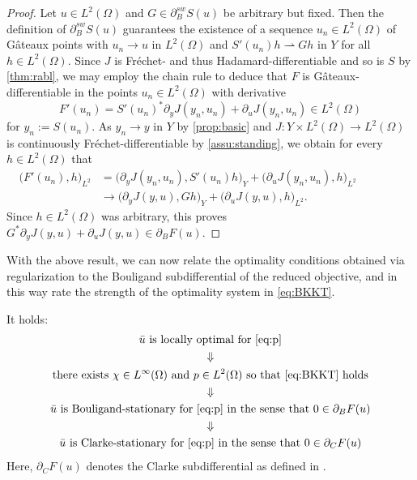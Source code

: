 \documentclass[reqno]{shinyart}
\begin{document}
\begin{proof}
    Let $u \in L^2(\Omega)$ and $G \in  \partial_B^{sw} S(u)$ be arbitrary but fixed. 
    Then the definition of $\partial_B^{sw} S(u)$ guarantees the existence of a sequence 
    $u_n \in L^2(\Omega)$ of G\^ateaux points with $u_n \to u$ in $L^2(\Omega)$ 
    and $S'(u_n)h \rightharpoonup G h$ in $Y$ for all $h \in L^2(\Omega)$. 
    Since $J$ is Fr\'echet- and thus Hadamard-differentiable and so is $S$ by 
    \cref{thm:rabl}, we may employ the chain rule 
    to deduce that $F$ is G\^ateaux-differentiable in the points $u_n \in L^2(\Omega)$ with
    derivative
    \begin{equation*}
        F'(u_n) = S'(u_n)^*\partial_y J(y_n, u_n) + \partial_u J( y_n, u_n) \in L^2(\Omega)
    \end{equation*}
    for $y_n := S(u_n)$. As $y_n \to y$ in $Y$ by \cref{prop:basic} 
    and $J : Y \times L^2(\Omega) \to L^2(\Omega)$ is continuously Fr\'echet-differentiable
    by \cref{assu:standing}, we obtain for every $h\in L^2(\Omega)$ that 
    \begin{equation*}
        \begin{aligned}
            \big( F'(u_n), h \big)_{L^2} 
            &=  \big( \partial_y J(y_n, u_n) , S'(u_n)h \big)_{Y} 
            + \big(\partial_u J( y_n, u_n) , h\big)_{L^2}\qquad\qquad \\
            &\to \big( \partial_y J(y, u) , G h\big )_{Y} +  \big(\partial_u J( y, u) , h \big)_{L^2}. 
        \end{aligned}
    \end{equation*}
    Since $h\in L^2(\Omega)$ was arbitrary, 
    this proves $G^*\partial_y J(y, u) + \partial_u J( y, u) \in \partial_B F(u)$.
\end{proof}

With the above result, we can now relate the optimality conditions obtained via regularization 
to the Bouligand subdifferential of the reduced objective, 
and in this way rate the strength of the optimality system in \eqref{eq:BKKT}.
\begin{theorem}\label{theorem:summary}
    It holds:
    \begin{gather*}
        \bar{u}   \text{ is locally optimal for }\eqref{eq:p}\\
        \Downarrow\\
        \text{there exists $\chi\in L^\infty(\Omega)$ and $p\in L^2(\Omega)$ so that \eqref{eq:BKKT} holds}\\
        \Downarrow\\
        \bar{u} \text{ is Bouligand-stationary for }\eqref{eq:p} 
        \text{ in the sense that } 0 \in \partial_B F(u)\\
        \Downarrow\\
        \bar{u} \text{ is Clarke-stationary for }\eqref{eq:p} 
        \text{ in the sense that } 0 \in \partial_C F(u)
    \end{gather*}
    Here, $\partial_C F(u)$ denotes the Clarke subdifferential as defined in \cite[Sec.~2.1]{Clarke:1990}.
\end{theorem}
\end{document}
